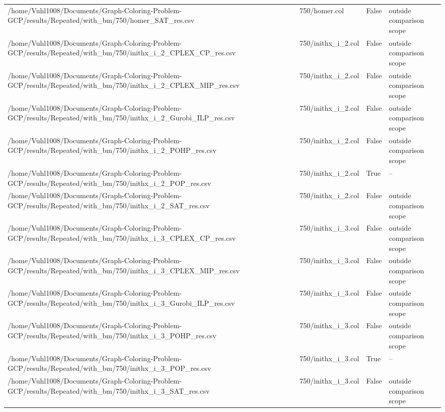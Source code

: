 \begin{table}[htbp]
\begin{tabular}{llll}
/home/Vuhl1008/Documents/Graph-Coloring-Problem-GCP/results/Repeated/with\_bm/750/homer\_SAT\_res.csv & 750/homer.col & False & outside comparison scope \\
/home/Vuhl1008/Documents/Graph-Coloring-Problem-GCP/results/Repeated/with\_bm/750/inithx\_i\_2\_CPLEX\_CP\_res.csv & 750/inithx\_i\_2.col & False & outside comparison scope \\
/home/Vuhl1008/Documents/Graph-Coloring-Problem-GCP/results/Repeated/with\_bm/750/inithx\_i\_2\_CPLEX\_MIP\_res.csv & 750/inithx\_i\_2.col & False & outside comparison scope \\
/home/Vuhl1008/Documents/Graph-Coloring-Problem-GCP/results/Repeated/with\_bm/750/inithx\_i\_2\_Gurobi\_ILP\_res.csv & 750/inithx\_i\_2.col & False & outside comparison scope \\
/home/Vuhl1008/Documents/Graph-Coloring-Problem-GCP/results/Repeated/with\_bm/750/inithx\_i\_2\_POHP\_res.csv & 750/inithx\_i\_2.col & False & outside comparison scope \\
/home/Vuhl1008/Documents/Graph-Coloring-Problem-GCP/results/Repeated/with\_bm/750/inithx\_i\_2\_POP\_res.csv & 750/inithx\_i\_2.col & True & -- \\
/home/Vuhl1008/Documents/Graph-Coloring-Problem-GCP/results/Repeated/with\_bm/750/inithx\_i\_2\_SAT\_res.csv & 750/inithx\_i\_2.col & False & outside comparison scope \\
/home/Vuhl1008/Documents/Graph-Coloring-Problem-GCP/results/Repeated/with\_bm/750/inithx\_i\_3\_CPLEX\_CP\_res.csv & 750/inithx\_i\_3.col & False & outside comparison scope \\
/home/Vuhl1008/Documents/Graph-Coloring-Problem-GCP/results/Repeated/with\_bm/750/inithx\_i\_3\_CPLEX\_MIP\_res.csv & 750/inithx\_i\_3.col & False & outside comparison scope \\
/home/Vuhl1008/Documents/Graph-Coloring-Problem-GCP/results/Repeated/with\_bm/750/inithx\_i\_3\_Gurobi\_ILP\_res.csv & 750/inithx\_i\_3.col & False & outside comparison scope \\
/home/Vuhl1008/Documents/Graph-Coloring-Problem-GCP/results/Repeated/with\_bm/750/inithx\_i\_3\_POHP\_res.csv & 750/inithx\_i\_3.col & False & outside comparison scope \\
/home/Vuhl1008/Documents/Graph-Coloring-Problem-GCP/results/Repeated/with\_bm/750/inithx\_i\_3\_POP\_res.csv & 750/inithx\_i\_3.col & True & -- \\
/home/Vuhl1008/Documents/Graph-Coloring-Problem-GCP/results/Repeated/with\_bm/750/inithx\_i\_3\_SAT\_res.csv & 750/inithx\_i\_3.col & False & outside comparison scope \\

\end{tabular}
\end{table}
